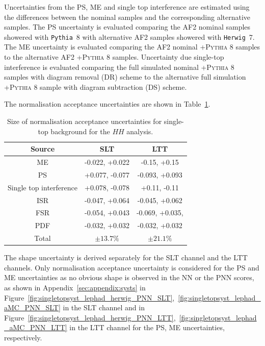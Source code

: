 Uncertainties from the PS, ME
and single top interference are estimated using 
the differences between the nominal samples and the corresponding 
alternative samples.
The PS uncertainty is evaluated comparing 
the AF2 nominal samples showered with \texttt{Pythia}~8 with alternative 
AF2 samples showered with \texttt{Herwig}~7.  
The ME uncertainty is evaluated comparing the AF2 nominal \POWHEG+\textsc{Pythia 8}
samples to the alternative AF2 \AMCatNLO+\textsc{Pythia 8} samples.  
Uncertainty due single-top interference is evaluated comparing the full simulated nominal 
\POWHEG+\textsc{Pythia 8} samples with diagram removal (DR) scheme to the alternative 
full simulation \POWHEG+\textsc{Pythia 8} sample with diagram subtraction (DS) scheme.

The normalisation acceptance uncertainties are shown in 
Table~\ref{sec:systs:tab:systematics_normalisations_singletop}.

\begin{table}
\centering
\small
\begin{tabular}{|c|c|c|}
\hline
Source & SLT & LTT \\
\hline
ME & -0.022, +0.022 & -0.15, +0.15  \\  
PS & +0.077, -0.077 & -0.093, +0.093  \\
Single top interference & +0.078, -0.078 & +0.11, -0.11  \\
ISR & -0.047, +0.064 & -0.045, +0.062  \\ 
FSR & -0.054, +0.043 & -0.069, +0.035,  \\
PDF & -0.032, +0.032 & -0.032, +0.032   \\
Total & $\pm 13.7\%$ & $\pm 21.1\%$ \\
\hline
\end{tabular}
\caption{Size of normalisation acceptance uncertainties for single-top background for the $HH$ analysis.}
\label{sec:systs:tab:systematics_normalisations_singletop}
\end{table}

  
The shape uncertainty is derived separately for the SLT channel and the LTT channels. 
Only normalisation acceptance uncertainty is considered for the PS and ME uncertainties 
as no obvious shape is observed in the NN or the PNN scores,
as shown in Appendix~\ref{sec:appendix:systs} 
in Figure~\ref{fig:singletopsyst_lephad_herwig_PNN_SLT},~\ref{fig:singletopsyst_lephad_aMC_PNN_SLT}
in the SLT channel and 
in Figure~\ref{fig:singletopsyst_lephad_herwig_PNN_LTT},~\ref{fig:singletopsyst_lephad_aMC_PNN_LTT}
in the LTT channel
for the PS, ME uncertainties, respectively.


